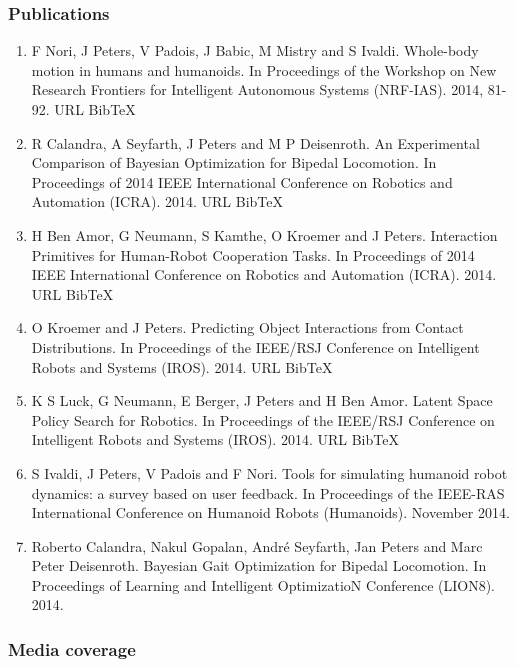 \subsubsection{Publications}

\begin{enumerate}
\item F Nori, J Peters, V Padois, J Babic, M Mistry and S Ivaldi. Whole-body motion in humans and humanoids. In Proceedings of the Workshop on New Research Frontiers for Intelligent Autonomous Systems (NRF-IAS). 2014, 81-92. URL BibTeX
\item R Calandra, A Seyfarth, J Peters and M P Deisenroth. An Experimental Comparison of Bayesian Optimization for Bipedal Locomotion. In Proceedings of 2014 IEEE International Conference on Robotics and Automation (ICRA). 2014. URL BibTeX
\item H Ben Amor, G Neumann, S Kamthe, O Kroemer and J Peters. Interaction Primitives for Human-Robot Cooperation Tasks. In Proceedings of 2014 IEEE International Conference on Robotics and Automation (ICRA). 2014. URL BibTeX
\item O Kroemer and J Peters. Predicting Object Interactions from Contact Distributions. In Proceedings of the IEEE/RSJ Conference on Intelligent Robots and Systems (IROS). 2014. URL BibTeX
\item K S Luck, G Neumann, E Berger, J Peters and H Ben Amor. Latent Space Policy Search for Robotics. In Proceedings of the IEEE/RSJ Conference on Intelligent Robots and Systems (IROS). 2014. URL BibTeX
\item S Ivaldi, J Peters, V Padois and F Nori. Tools for simulating humanoid robot dynamics: a survey based on user feedback. In Proceedings of the IEEE-RAS International Conference on Humanoid Robots (Humanoids). November 2014.
\item Roberto Calandra, Nakul Gopalan, André Seyfarth, Jan Peters and Marc Peter Deisenroth. Bayesian Gait Optimization for Bipedal Locomotion. In Proceedings of Learning and Intelligent OptimizatioN Conference (LION8). 2014.
\end{enumerate}

\subsubsection{Media coverage}

